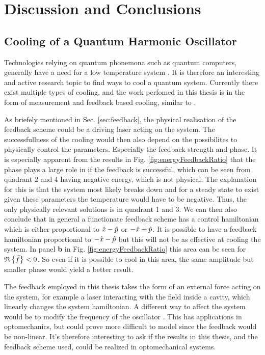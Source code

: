 \section{Discussion and Conclusions}

\subsection{Cooling of a Quantum Harmonic Oscillator}
Technologies relying on quantum phonemona such as quantum computers, generally have a need for a low temperature system \cite{Nielsen:2010}. It is therefore an interesting and active research topic to find ways to cool a quantum system. Currently there exist multiple types of cooling, and the work perfomed in this thesis is in the form of measurement and feedback based cooling, similar to \cite{De-Sousa:2025}.

As briefely mentioned in Sec. \ref{sec:feedback}, the physical realisation of the feedback scheme could be a driving laser acting on the system. The successfullness of the cooling would then also depend on the possibilites to physically control the parameters. Especially the feedback strength and phase. It is especially apparent from the results in Fig. \ref{fig:energyFeedbackRatio} that the phase plays a large role in if the feedback is successful, which can be seen from quadrant 2 and 4 having negative energy, which is not physical. The explanation for this is that the system most likely breaks down and for a steady state to exist given these parameters the temperature would have to be negative. Thus, the only physically relevant solutions is in quadrant 1 and 3. We can then also conclude that in general a functionate feedback scheme has a control hamiltonian which is either proportional to $\hat{x} - \hat{p}$ or $-\hat{x} + \hat{p}$. It is possible to have a feedback hamiltonian proportional to $-\hat{x} - \hat{p}$ but this will not be as effective at cooling the system. In panel \textbf{b} in Fig. \ref{fig:energyFeedbackRatio} this area can be seen for $\mathfrak{R}\left\{\tilde{f}\right\} < 0$. So even if it is possible to cool in this area, the same amplitude but smaller phase would yield a better result.

The feedback employed in this thesis takes the form of an external force acting on the system, for example a laser interacting with the field inside a cavity, which linearly changes the system hamiltonian. A different way to affect the system would be to modify the frequency of the oscillator \cite{Habibi:2016}. This has applications in optomechanics, but could prove more difficult to model since the feedback would be non-linear. It's therefore interesting to ask if the results in this thesis, and the feedback scheme used, could be realized in optomechanical systems.

